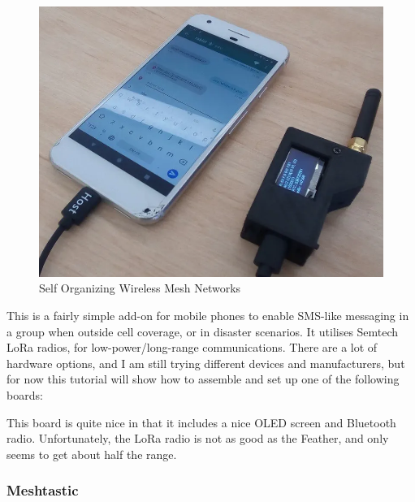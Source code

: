 				\noindent
				\begin{minipage}{0.48\textwidth}%
					\begin{figure}[H]
						\centering
						\includegraphics[width=\textwidth]{resources/img/chap4/lora-mesh-chat-5267d9}
						\caption[Self Organizing Wireless Mesh Networks]{Self Organizing Wireless Mesh Networks\cite{BADIS2015653}}
						\label{img:lora_mesh_chat}
					\end{figure}
				\end{minipage}%
				\hfill%
				\begin{minipage}{0.5\textwidth}\raggedright
					This is a fairly simple add-on for mobile phones to enable SMS-like messaging in a group when outside cell coverage, or in disaster scenarios. It utilises Semtech LoRa radios, for low-power/long-range communications. There are a lot of hardware options, and I am still trying different devices and manufacturers, but for now this tutorial will show how to assemble and set up one of the following boards:
					
					This board is quite nice in that it includes a nice OLED screen and Bluetooth radio. Unfortunately, the LoRa radio is not as good as the Feather, and only seems to get about half the range.
				\end{minipage}
			
				
				\subsubsection{Meshtastic}		
	
